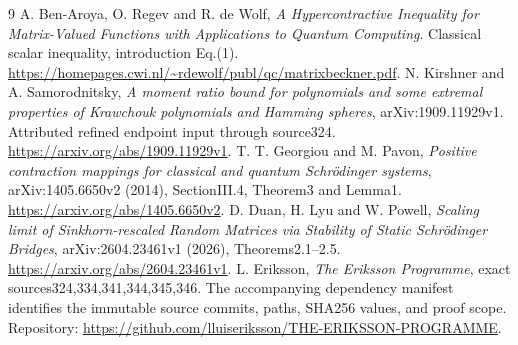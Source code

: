 \documentclass[11pt]{article}
\begin{document}
\begin{thebibliography}{9}
 A. Ben-Aroya, O. Regev and R. de Wolf, \emph{A Hypercontractive Inequality for Matrix-Valued Functions with Applications to Quantum Computing}. Classical scalar inequality, introduction Eq.(1). \url{https://homepages.cwi.nl/~rdewolf/publ/qc/matrixbeckner.pdf}.
 N. Kirshner and A. Samorodnitsky, \emph{A moment ratio bound for polynomials and some extremal properties of Krawchouk polynomials and Hamming spheres}, arXiv:1909.11929v1. Attributed refined endpoint input through source324. \url{https://arxiv.org/abs/1909.11929v1}.
 T. T. Georgiou and M. Pavon, \emph{Positive contraction mappings for classical and quantum Schr\"odinger systems}, arXiv:1405.6650v2 (2014), SectionIII.4, Theorem3 and Lemma1. \url{https://arxiv.org/abs/1405.6650v2}.
 D. Duan, H. Lyu and W. Powell, \emph{Scaling limit of Sinkhorn-rescaled Random Matrices via Stability of Static Schr\"odinger Bridges}, arXiv:2604.23461v1 (2026), Theorems2.1--2.5. \url{https://arxiv.org/abs/2604.23461v1}.
 L. Eriksson, \emph{The Eriksson Programme}, exact sources324,334,341,344,345,346. The accompanying dependency manifest identifies the immutable source commits, paths, SHA256 values, and proof scope. Repository: \url{https://github.com/lluiseriksson/THE-ERIKSSON-PROGRAMME}.
\end{thebibliography}
\end{document}

